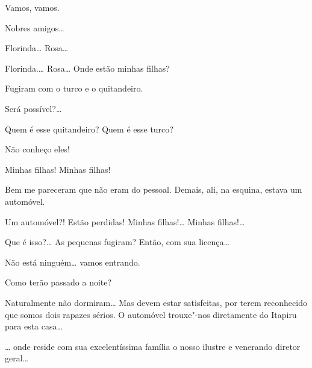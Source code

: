 \begin{linenumbers}
 Vamos, vamos. 

   Nobres amigos\ldots{}

  Florinda\ldots{} Rosa\ldots{}  

{}


   Florinda.\ldots{} Rosa\ldots{} Onde estão
minhas filhas?

 Fugiram com o turco e o quitandeiro.

  Será possível?\ldots{} 

 Quem é esse quitandeiro? Quem é esse turco?

 Não conheço eles!

 Minhas filhas! Minhas filhas!

 Bem me pareceram que não eram do pessoal. Demais, ali, na
esquina, estava um automóvel.

 Um automóvel?! Estão perdidas! Minhas filhas!\ldots{} Minhas
filhas!\ldots{} 

   Que é isso?\ldots{} As
pequenas fugiram? Então, com sua licença\ldots{} 







 Não está ninguém\ldots{} vamos entrando. 

 Como terão passado a noite?

 Naturalmente não dormiram\ldots{} Mas devem estar satisfeitas, por
terem reconhecido que somos dois rapazes sérios. O automóvel trouxe"-nos
diretamente do Itapiru para esta casa\ldots{}

 \ldots{} onde reside com sua excelentíssima
família o nosso ilustre e venerando diretor geral\ldots{}


\end{linenumbers}
